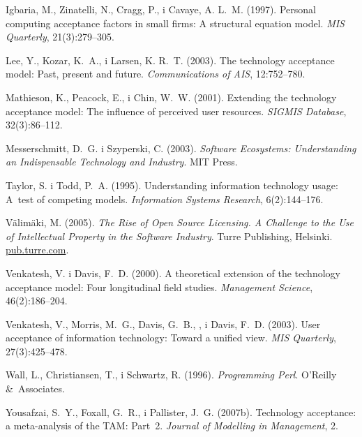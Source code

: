 \documentclass[brudnopis,xodstep]{wkmgr}
\begin{document}
\begin{thebibliography}{}
Igbaria, M., Zinatelli, N., Cragg, P., i Cavaye, A. L.~M. (1997).
 Personal computing acceptance factors in small firms: A structural
  equation model.
 \emph{MIS Quarterly}, 21(3):279--305.

Lee, Y., Kozar, K.~A., i Larsen, K. R.~T. (2003).
 The technology acceptance model: Past, present and future.
 \emph{Communications of AIS}, 12:752--780.

Mathieson, K., Peacock, E., i Chin, W.~W. (2001).
 Extending the technology acceptance model: The influence of perceived
  user resources.
 \emph{SIGMIS Database}, 32(3):86--112.

Messerschmitt, D.~G. i Szyperski, C. (2003).
\emph{Software Ecosystems: Understanding an Indispensable Technology
and Industry}. {MIT} Press.

Taylor, S. i Todd, P.~A. (1995).
 Understanding information technology usage: A~test of competing
  models.
 \emph{Information Systems Research}, 6(2):144--176.

V{\"a}lim{\"a}ki, M. (2005).
\emph{The Rise of Open Source Licensing. A Challenge to the Use of
  Intellectual Property in the Software Industry}.
Turre Publishing, Helsinki.
\url{pub.turre.com}.

Venkatesh, V. i Davis, F.~D. (2000).
 A theoretical extension of the technology acceptance model: Four
  longitudinal field studies.
 \emph{Management Science}, 46(2):186--204.

Venkatesh, V., Morris, M.~G., Davis, G.~B., , i Davis, F.~D. (2003).
 User acceptance of information technology: Toward a unified view.
 \emph{MIS Quarterly}, 27(3):425--478.

Wall, L., Christiansen, T., i Schwartz, R. (1996).
 \emph{Programming Perl}.
 O'Reilly \&~Associates.

Yousafzai, S.~Y., Foxall, G.~R., i Pallister, J.~G. (2007b).
Technology acceptance: a meta-analysis of the {TAM}: Part~2.
{\em Journal of Modelling in Management}, 2.

\end{thebibliography}

%
\clearpage 
{} %
\listoftables


\clearpage 
{} %
\listoffigures
\end{document}
